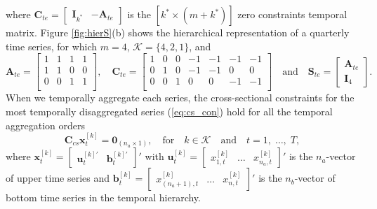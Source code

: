 \documentclass[a4paper,11pt]{article}
\newcommand{\bvet}{\bm{b}}
\newcommand{\uvet}{\bm{u}}
\newcommand{\xvet}{\bm{x}}
\newcommand{\Avet}{\bm{A}}
\newcommand{\Cvet}{\bm{C}}
\newcommand{\Ivet}{\bm{I}}
\newcommand{\Svet}{\bm{S}}
\newcommand{\Zerovet}{\bm{0}}
\theoremstyle{definition}
\begin{document}
where $\Cvet_{te} = \begin{bmatrix}\Ivet_{k^\ast} & -\Avet_{te}\end{bmatrix}$ is the $\left[k^\ast \times (m+k^\ast)\right]$ zero constraints temporal matrix.
Figure \ref{fig:hierS}(b) shows the hierarchical representation of a quarterly time series, for which $m = 4$, $\mathcal{K} = \{4,2,1\}$, and
$$
\Avet_{te} = \begin{bmatrix}
	1 & 1 & 1 & 1\\
	1 & 1 & 0 & 0\\
	0 & 0 & 1 & 1\\
\end{bmatrix}, \quad \Cvet_{te} = \begin{bmatrix}
	1 & 0 & 0 & -1 & -1 & -1 & -1\\
	0 & 1 & 0 & -1 & -1 & 0 & 0\\
	0 & 0 & 1 & 0 & 0 & -1 & -1\\
\end{bmatrix} \quad \mathrm{and} \quad \Svet_{te} = \begin{bmatrix}
	\Avet_{te} \\
	\Ivet_4
\end{bmatrix}.
$$
When we temporally aggregate each series, the cross-sectional constraints for the most temporally disaggregated series (\ref{eq:cs_con}) hold for all the temporal aggregation orders
\begin{equation}
\label{eq:cs_con2}
	\Cvet_{cs}\xvet^{[k]}_t = \Zerovet_{(n_a \times 1)}, \quad \mathrm{for} \quad k \in \mathcal{K} \quad \mathrm{and} \quad t = 1, \;\dots, \;T,
\end{equation}
where $\xvet_t^{[k]} = \begin{bmatrix}
 \uvet_t^{[k]\prime} & \bvet_t^{[k]\prime}
 \end{bmatrix}'$ with $\uvet^{[k]}_t = \begin{bmatrix} x^{[k]}_{1,t} & \dots & x^{[k]}_{n_a,t}
\end{bmatrix}'$ is the $n_a$-vector of upper time series and $\bvet^{[k]}_t = \begin{bmatrix} x^{[k]}_{(n_a+1),t} & \dots & x^{[k]}_{n,t} \end{bmatrix}'$ is the $n_b$-vector of bottom time series in the temporal hierarchy.
\end{document}
